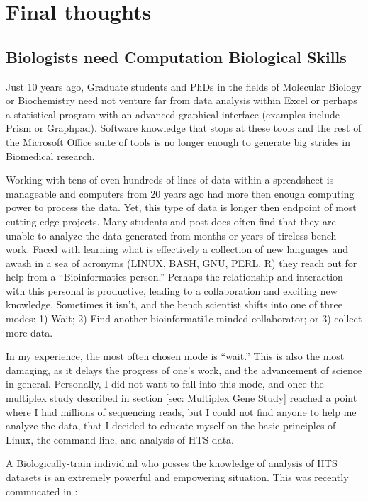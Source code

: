 \section{Final thoughts}\label{Disc:sec:Final Thoughts}

  \subsection{Biologists need Computation Biological Skills}\label{Disc:subsec:Biologists need Comp Skills}

    Just 10 years ago,  Graduate students and PhDs in the fields of Molecular Biology or Biochemistry need not venture far from data analysis within Excel or perhaps a statistical program with an advanced graphical interface (examples include Prism or Graphpad). Software knowledge that stops at these tools and the rest of the Microsoft Office suite of tools is no longer enough to generate big strides in Biomedical research.

    Working with tens of even hundreds of lines of data within a spreadsheet is manageable and computers from 20 years ago had more then enough computing power to process the data. Yet, this type of data is longer then endpoint of most cutting edge projects. Many students and post docs often find that they are unable to analyze the data generated from months or years of tireless bench work. Faced with learning what is effectively a collection of new languages and awash in a sea of acronyms (LINUX, BASH, GNU, PERL, R) they reach out for help from a ``Bioinformatics person.'' Perhaps the relationship and interaction with this personal is productive, leading to a collaboration and exciting new knowledge. Sometimes it isn't, and the bench scientist shifts into one of three modes: 1) Wait; 2) Find another bioinformati1c-minded collaborator; or 3) collect more data.

    In my experience, the most often chosen mode is ``wait.'' This is also the most damaging, as it delays the progress of one's work, and the advancement of science in general. Personally, I did not want to fall into this mode, and once the multiplex study described in section \ref{sec: Multiplex Gene Study} reached a point where I had millions of sequencing reads, but I could not find anyone to help me analyze the data, that I decided to educate myself on the basic principles of Linux, the command line, and analysis of HTS data.

    A Biologically-train individual who posses the knowledge of analysis of HTS datasets is an extremely powerful and empowering situation. This was recently commucated in \citet{Plocik2013}:

